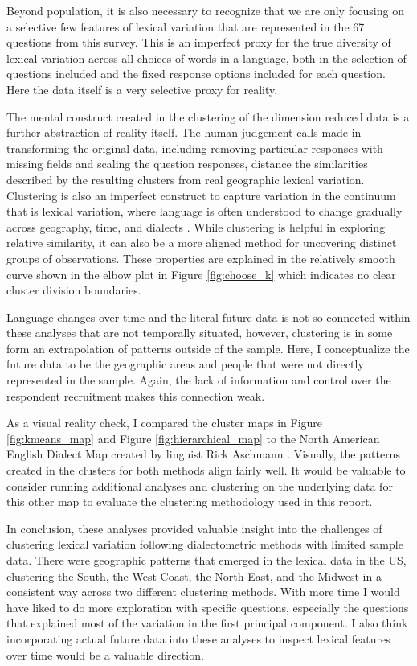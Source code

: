 \documentclass[10pt,letterpaper]{article}
\begin{document}
Beyond population, it is also necessary to recognize that we are only focusing on a selective few features of lexical variation that are represented in the 67 questions from this survey. This is an imperfect proxy for the true diversity of lexical variation across all choices of words in a language, both in the selection of questions included and the fixed response options included for each question. Here the data itself is a very selective proxy for reality.

The mental construct created in the clustering of the dimension reduced data is a further abstraction of reality itself. The human judgement calls made in transforming the original data, including removing particular responses with missing fields and scaling the question responses, distance the similarities described by the resulting clusters from real geographic lexical variation. Clustering is also an imperfect construct to capture variation in the continuum that is lexical variation, where language is often understood to change gradually across geography, time, and dialects \cite{nerbonne_introducing_2003}. While clustering is helpful in exploring relative similarity, it can also be a more aligned method for uncovering distinct groups of observations. These properties are explained in the relatively smooth curve shown in the elbow plot in Figure \ref{fig:choose_k} which indicates no clear cluster division boundaries.

Language changes over time \cite{nerbonne_introducing_2003} and the literal future data is not so connected within these analyses that are not temporally situated, however, clustering is in some form an extrapolation of patterns outside of the sample. Here, I conceptualize the future data to be the geographic areas and people that were not directly represented in the sample. Again, the lack of information and control over the respondent recruitment makes this connection weak. 

As a visual reality check, I compared the cluster maps in Figure \ref{fig:kmeans_map} and Figure \ref{fig:hierarchical_map} to the North American English Dialect Map created by linguist Rick Aschmann \cite{aschmann_american_2018}. Visually, the patterns created in the clusters for both methods align fairly well. It would be valuable to consider running additional analyses and clustering on the underlying data for this other map to evaluate the clustering methodology used in this report. 


In conclusion, these analyses provided valuable insight into the challenges of clustering lexical variation following dialectometric methods with limited sample data. There were geographic patterns that emerged in the lexical data in the US, clustering the South, the West Coast, the North East, and the Midwest in a consistent way across two different clustering methods. With more time I would have liked to do more exploration with specific questions, especially the questions that explained most of the variation in the first principal component. I also think incorporating actual future data into these analyses to inspect lexical features over time would be a valuable direction. 
\end{document}
